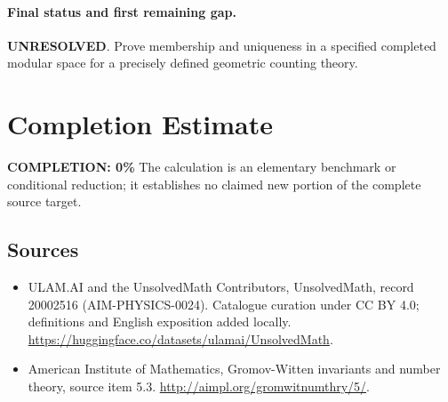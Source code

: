 \documentclass[11pt]{article}
\begin{document}
\paragraph{Final status and first remaining gap.}
\textbf{UNRESOLVED}. Prove membership and uniqueness in a specified completed modular space for a precisely defined geometric counting theory.

\section{Completion Estimate}
\noindent\textbf{COMPLETION: 0\%}
The calculation is an elementary benchmark or conditional reduction; it establishes no claimed new portion of the complete source target.

\subsection{Sources}
\begin{itemize}
\item[\hypertarget{source:20002516:1}{S1}] ULAM.AI and the UnsolvedMath Contributors, UnsolvedMath, record 20002516 (AIM-PHYSICS-0024). Catalogue curation under CC BY 4.0; definitions and English exposition added locally.
\url{https://huggingface.co/datasets/ulamai/UnsolvedMath}.
\item[\hypertarget{source:20002516:2}{S2}] American Institute of Mathematics, Gromov-Witten invariants and number theory, source item 5.3.
\url{http://aimpl.org/gromwitnumthry/5/}.
\end{itemize}
\label{end:20002516}
\end{document}

